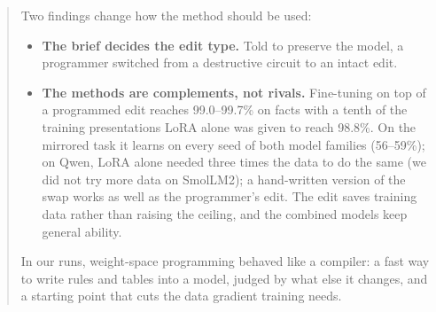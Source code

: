 \begin{abstract}
Two findings change how the method should be used:
\begin{itemize}
  \item \textbf{The brief decides the edit type.} Told to preserve the model, a programmer switched from a destructive circuit to an intact edit.
  \item \textbf{The methods are complements, not rivals.} Fine-tuning on top of a programmed edit reaches 99.0--99.7\% on facts with a tenth of the training presentations LoRA alone was given to reach 98.8\%. On the mirrored task it learns on every seed of both model families (56--59\%); on Qwen, LoRA alone needed three times the data to do the same (we did not try more data on SmolLM2); a hand-written version of the swap works as well as the programmer's edit. The edit saves training data rather than raising the ceiling, and the combined models keep general ability.
\end{itemize}
In our runs, weight-space programming behaved like a compiler: a fast way to write rules and tables into a model, judged by what else it changes, and a starting point that cuts the data gradient training needs.
\end{abstract}
